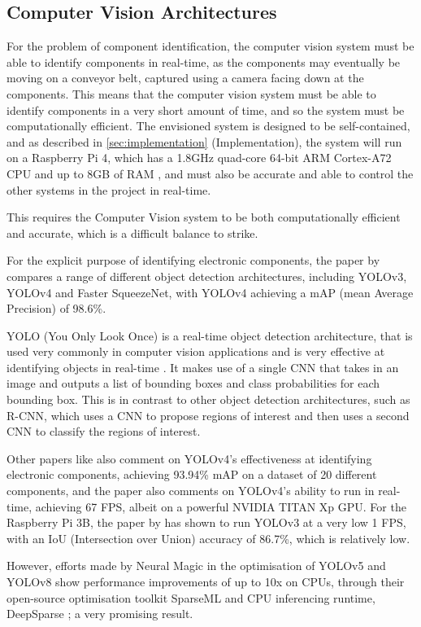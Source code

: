 \subsection{Computer Vision Architectures}
For the problem of component identification, the computer vision system must be able to identify components in real-time, as the components may eventually be moving on a conveyor belt, captured using
a camera facing down at the components. This means that the computer vision system must be able to identify components in a very short amount of time, and so the system must be computationally efficient.
The envisioned system is designed to be self-contained, and as described in \autoref{sec:implementation} (Implementation), the system will run on a Raspberry Pi 4, which has a 1.8GHz quad-core 64-bit ARM Cortex-A72 CPU and up to 8GB of RAM \cite{pi4},
and must also be accurate and able to control the other systems in the project in real-time.

This requires the Computer Vision system to be both computationally efficient and accurate, which is a difficult balance to strike.

For the explicit purpose of identifying electronic components, the paper by \citet{s22239079} compares a range of different object detection architectures, including YOLOv3, YOLOv4 and Faster SqueezeNet, with YOLOv4 achieving a mAP (mean Average Precision) of 98.6\%.

YOLO (You Only Look Once) is a real-time object detection architecture, that is used very commonly in computer vision applications and is very effective at identifying objects in real-time \citet{yolo}. It makes
use of a single CNN that takes in an image and outputs a list of bounding boxes and class probabilities for each bounding box. This is in contrast to other object detection architectures, such as R-CNN, which uses a CNN to propose regions of interest and then uses a second CNN to classify the regions of interest.

Other papers like \citet{Guo2021} also comment on YOLOv4's effectiveness at identifying electronic components, achieving 93.94\% mAP on a dataset of 20 different components, and the paper also comments
on YOLOv4's ability to run in real-time, achieving 67 FPS, albeit on a powerful NVIDIA TITAN Xp GPU. For the Raspberry Pi 3B, the paper by \citet{9166199} has shown to run YOLOv3 at a very low 1 FPS,
with an IoU (Intersection over Union) accuracy of 86.7\%, which is relatively low.

However, efforts made by Neural Magic \cite{neuralmagic} in the optimisation of YOLOv5 and YOLOv8 show performance improvements of up to 10x on CPUs, through their open-source 
optimisation toolkit SparseML \cite{sparseml} and CPU inferencing runtime, DeepSparse \cite{deepsparse}; a very promising result.


